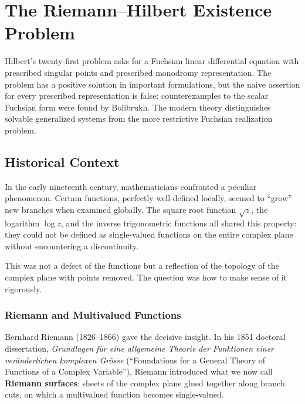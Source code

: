 
\chapter{The Riemann--Hilbert Existence Problem}

\begin{partiallybox}
Hilbert's twenty-first problem asks for a Fuchsian linear differential equation with prescribed singular points and prescribed monodromy representation. The problem has a positive solution in important formulations, but the naive assertion for every prescribed representation is false: counterexamples to the scalar Fuchsian form were found by Bolibrukh. The modern theory distinguishes solvable generalized systems from the more restrictive Fuchsian realization problem.
\end{partiallybox}

\section{Historical Context}

In the early nineteenth century, mathematicians confronted a peculiar phenomenon. Certain functions, perfectly well-defined locally, seemed to ``grow'' new branches when examined globally. The square root function $\sqrt{z}$, the logarithm $\log z$, and the inverse trigonometric functions all shared this property: they could not be defined as single-valued functions on the entire complex plane without encountering a discontinuity.

This was not a defect of the functions but a reflection of the topology of the complex plane with points removed. The question was how to make sense of it rigorously.

\subsection{Riemann and Multivalued Functions}

Bernhard Riemann (1826--1866) gave the decisive insight. In his 1851 doctoral dissertation, \emph{Grundlagen f\"ur eine allgemeine Theorie der Funktionen einer ver\"anderlichen komplexen Gr\"osse} (``Foundations for a General Theory of Functions of a Complex Variable''), Riemann introduced what we now call \textbf{Riemann surfaces}: sheets of the complex plane glued together along branch cuts, on which a multivalued function becomes single-valued.

